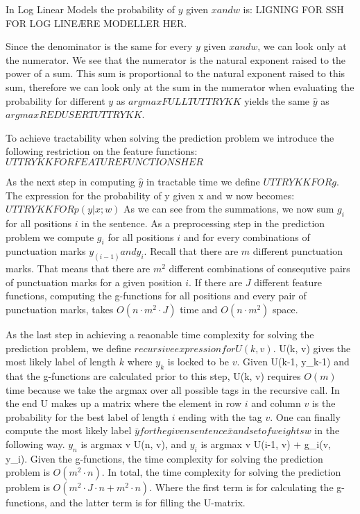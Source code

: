 \documentclass[12pt]{article}
\begin{document}
In Log Linear Models the probability of $y$ given $x and w$ is: LIGNING FOR SSH FOR LOG LINEÆRE MODELLER HER.

Since the denominator is the same for every $y$ given $x and w$, we can look only at the numerator. We see that the numerator is the natural exponent raised to the power of a sum. This sum is proportional to the natural exponent raised to this sum, therefore we can look only at the sum in the numerator when evaluating the probability for different $y$ as $argmax FULLT UTTRYKK$ yields the same $\hat y$ as $argmax REDUSERT UTTRYKK$. 

To achieve tractability when solving the prediction problem we introduce the following restriction on the feature functions: $UTTRYKK FOR FEATURE FUNCTIONS HER$

As the next step in computing $\hat y$ in tractable time we define $UTTRYKK FOR g$. 
The expression for the probability of y given x and w now becomes:  $UTTRYKK FOR p(y|x;w)$ As we can see from the summations, we now sum $g_i$ for all positions $i$ in the sentence. As a preprocessing step in the prediction problem we compute $g_i$ for all positions $i$ and for every combinations of punctuation marks $y_(i-1) and y_i$. Recall that there are $m$ different punctuation marks. That means that there are $m^2$ different combinations of consequtive pairs of punctuation marks for a given position $i$. If there are $J$ different feature functions, computing the g-functions for all positions and every pair of punctuation marks, takes $O(n \cdot m^2 \cdot J)$ time and $O(n \cdot m^2)$ space. 

As the last step in achieving a reaonable time complexity for solving the prediction problem, we define $recursive expression for U(k, v)$. U(k, v) gives the most likely label of length $k$ where $y_k$ is locked to be $v$. Given U(k-1, y_k-1) and that the g-functions are calculated prior to this step, U(k, v) requires $O(m)$ time because we take the argmax over all possible tags in the recursive call. In the end U makes up a matrix where the element in row $i$ and column $v$ is the probability for the best label of length $i$ ending with the tag $v$. One can finally compute the most likely label $\bar y for the given sentence \bar x and set of weights w$ in the following way. $y_n$ is argmax v U(n, v), and $y_i$ is argmax v U(i-1, v) + g_i(v, y_i). Given the g-functions, the time complexity for solving the prediction problem is $O(m^2 \cdot n)$. In total, the time complexity for solving the prediction problem is $O(m^2 \cdot J \cdot n + m^2 \cdot n)$. Where the first term is for calculating the g-functions, and the latter term is for filling the U-matrix.  
\end{document}
